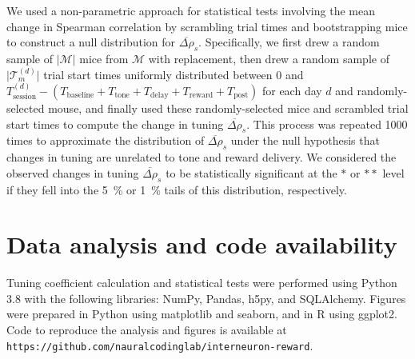 \documentclass{article}
\begin{document}
We used a non-parametric approach for statistical tests involving the mean
change in Spearman correlation by scrambling trial times and bootstrapping mice
to construct a null distribution for $\overline{\Delta\rho}_{s}$. Specifically,
we first drew a random sample of $\lvert \mathcal{M} \rvert$ mice from
$\mathcal{M}$ with replacement, then drew a random sample of $\lvert
\mathcal{T}_m^{(d)} \rvert$ trial start times uniformly distributed between 0
and $T_\text{session}^{(d)} - (T_\text{baseline} + T_\text{tone} +
T_\text{delay} + T_\text{reward} + T_\text{post})$ for each day $d$ and
randomly-selected mouse, and finally used these randomly-selected mice and
scrambled trial start times to compute the change in tuning
$\overline{\Delta\rho}_{s}$. This process was repeated 1000 times to approximate
the distribution of $\overline{\Delta\rho}_{s}$ under the null hypothesis that
changes in tuning are unrelated to tone and reward delivery. We considered the
observed changes in tuning $\overline{\Delta\rho}_{s}$ to be statistically
significant at the $*$ or $**$ level if they fell into the \SI{5}{\percent} or
\SI{1}{\percent} tails of this distribution, respectively.

\section{Data analysis and code availability}

Tuning coefficient calculation and statistical tests were performed using Python
3.8 with the following libraries: NumPy, Pandas, h5py, and SQLAlchemy. Figures
were prepared in Python using matplotlib and seaborn, and in R using ggplot2.
Code to reproduce the analysis and figures is available at
\texttt{https://github.com/nauralcodinglab/interneuron-reward}.
\end{document}
